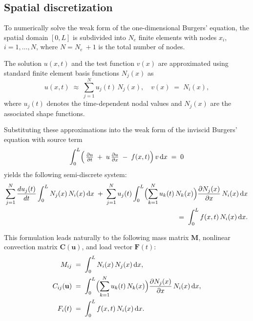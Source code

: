 \subsection{Spatial discretization}

To numerically solve the weak form of the one-dimensional Burgers' equation, the spatial domain \([0, L]\) is subdivided into \(N_e\) finite elements with nodes \(x_i\), \(i = 1, \dots, N\), where \(N = N_e\ + 1\) is the total number of nodes.

The solution \(u(x,t)\) and the test function \(v(x)\) are approximated using standard finite element basis functions \(N_j(x)\) as
\begin{equation}
u(x,t) \;\approx\; \sum_{j=1}^{N} u_j(t)\,N_j(x), 
\quad 
v(x) \;=\; N_i(x),
\end{equation}
where \(u_j(t)\) denotes the time-dependent nodal values and \(N_j(x)\) are the associated shape functions.

Substituting these approximations into the weak form of the inviscid Burgers' equation with source term 
\begin{equation}
\int_0^L 
\Bigl(\,
\tfrac{\partial u}{\partial t}
\;+\;
u\,\tfrac{\partial u}{\partial x}
\;-\;
f(x,t)
\Bigr)\,v\,\mathrm{d}x
\;=\;
0
\end{equation}
yields the following semi-discrete system:
\begin{equation}
\begin{split}
\sum_{j=1}^{N} \frac{du_j(t)}{dt} 
\int_0^L 
N_j(x)\,N_i(x)\,\mathrm{d}x
\;+\;
\sum_{j=1}^{N} 
u_j(t)
\int_0^L 
\Bigl(\sum_{k=1}^{N} u_k(t)\,N_k(x)\Bigr)
\frac{\partial N_j(x)}{\partial x}\,N_i(x)\,\mathrm{d}x
\\
\;=\;
\int_0^L 
f(x,t)\,N_i(x)\,\mathrm{d}x.
\end{split}
\label{eq:standard_semidiscrete}
\end{equation}

This formulation leads naturally to the following mass matrix \(\mathbf{M}\), nonlinear convection matrix \(\mathbf{C}(\mathbf{u})\), and load vector \(\mathbf{F}(t)\):
\begin{subequations}
\begin{align}
M_{ij} &\;=\; \int_0^L N_i(x)\,N_j(x)\,\mathrm{d}x,
\\
C_{ij}(\mathbf{u}) &\;=\; \int_0^L 
\Bigl(\sum_{k=1}^{N} u_k(t)\,N_k(x)\Bigr) 
\frac{\partial N_j(x)}{\partial x}\,N_i(x)\,\mathrm{d}x,
\\
F_i(t) &\;=\; \int_0^L f(x,t)\,N_i(x)\,\mathrm{d}x.
\end{align}
\end{subequations}


